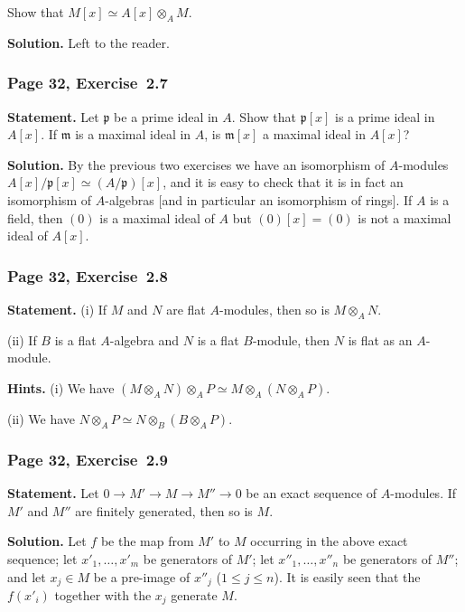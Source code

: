\documentclass[12pt,letterpaper]{article}%
\newcommand{\mf}{\mathfrak}
\newcommand{\mmm}{\mf m}
\newcommand{\ppp}{\mf p}
\newcommand{\nn}{\noindent}
\begin{document}
Show that $M[x]\simeq A[x]\otimes_A M$.

\nn\textbf{Solution.} Left to the reader.%

\subsubsection{Page 32, Exercise~2.7}%

\textbf{Statement.} Let $\ppp$ be a prime ideal in $A$. Show that $\ppp[x]$ is a prime ideal in $A[x]$. If $\mmm$ is a maximal ideal in $A$, is $\mmm[x]$ a maximal ideal in $A[x]$? 

\nn\textbf{Solution.} By the previous two exercises we have an isomorphism of $A$-modules $A[x]/\ppp[x]\simeq(A/\ppp)[x]$, and it is easy to check that it is in fact an isomorphism of $A$-algebras [and in particular an isomorphism of rings]. If $A$ is a field, then $(0)$ is a maximal ideal of $A$ but $(0)[x]=(0)$ is not a maximal ideal of $A[x]$.

\subsubsection{Page 32, Exercise~2.8}\label{ex2.8}%

\textbf{Statement.} (i) If $M$ and $N$ are flat $A$-modules, then so is $M\otimes_AN$.

\nn(ii) If $B$ is a flat $A$-algebra and $N$ is a flat $B$-module, then $N$ is flat as an $A$-module.%

\nn\textbf{Hints.} (i) We have $(M\otimes_AN)\otimes_AP\simeq M\otimes_A(N\otimes_AP)$.

\nn(ii) We have $N\otimes_AP\simeq N\otimes_B(B\otimes_AP)$.

\subsubsection{Page 32, Exercise~2.9}%

\textbf{Statement.} Let $0\to M'\to M\to M''\to 0$ be an exact sequence of $A$-modules. If $M'$ and $M''$ are finitely generated, then so is $M$.

\nn\textbf{Solution.} Let $f$ be the map from $M'$ to $M$ occurring in the above exact sequence; let $x'_1,\ldots,x'_m$ be generators of $M'$; let $x''_1,\ldots,x''_n$ be generators of $M''$; and let $x_j\in M$ be a pre-image of $x''_j$ ($1\le j\le n$). It is easily seen that the $f(x'_i)$ together with the $x_j$ generate $M$.
\end{document}

